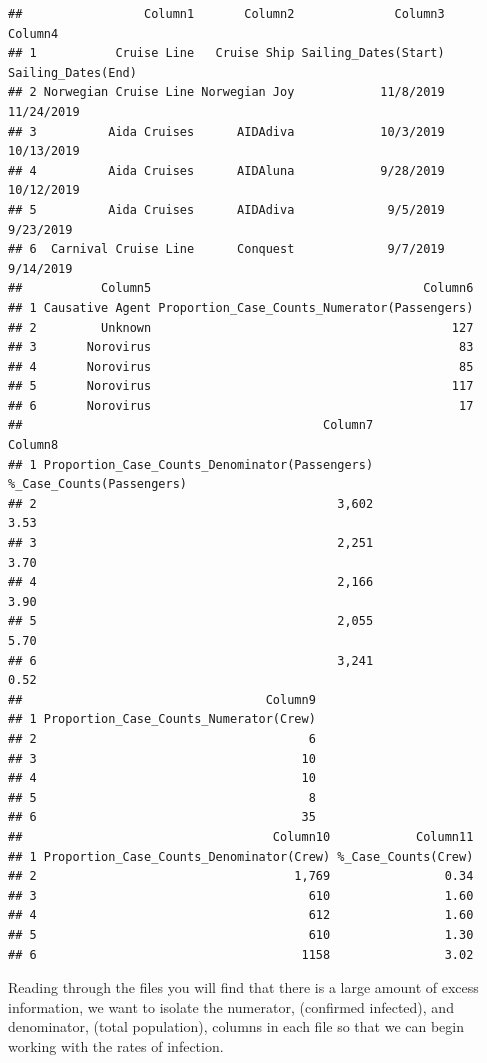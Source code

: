 \documentclass[
  11,
]{book}
\begin{document}
\begin{verbatim}
##                 Column1       Column2              Column3            Column4
## 1           Cruise Line   Cruise Ship Sailing_Dates(Start) Sailing_Dates(End)
## 2 Norwegian Cruise Line Norwegian Joy            11/8/2019         11/24/2019
## 3          Aida Cruises      AIDAdiva            10/3/2019         10/13/2019
## 4          Aida Cruises      AIDAluna            9/28/2019         10/12/2019
## 5          Aida Cruises      AIDAdiva             9/5/2019          9/23/2019
## 6  Carnival Cruise Line      Conquest             9/7/2019          9/14/2019
##           Column5                                      Column6
## 1 Causative Agent Proportion_Case_Counts_Numerator(Passengers)
## 2         Unknown                                          127
## 3       Norovirus                                           83
## 4       Norovirus                                           85
## 5       Norovirus                                          117
## 6       Norovirus                                           17
##                                          Column7                   Column8
## 1 Proportion_Case_Counts_Denominator(Passengers) %_Case_Counts(Passengers)
## 2                                          3,602                      3.53
## 3                                          2,251                      3.70
## 4                                          2,166                      3.90
## 5                                          2,055                      5.70
## 6                                          3,241                      0.52
##                                  Column9
## 1 Proportion_Case_Counts_Numerator(Crew)
## 2                                      6
## 3                                     10
## 4                                     10
## 5                                      8
## 6                                     35
##                                   Column10            Column11
## 1 Proportion_Case_Counts_Denominator(Crew) %_Case_Counts(Crew)
## 2                                    1,769                0.34
## 3                                      610                1.60
## 4                                      612                1.60
## 5                                      610                1.30
## 6                                     1158                3.02
\end{verbatim}

Reading through the files you will find that there is a large amount of excess information, we want to isolate the numerator, (confirmed infected), and denominator, (total population), columns in each file so that we can begin working with the rates of infection.
\end{document}
